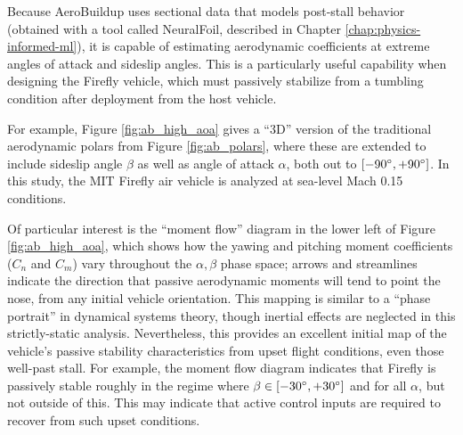 Because AeroBuildup uses sectional data that models post-stall behavior (obtained with a tool called NeuralFoil, described in Chapter \ref{chap:physics-informed-ml}), it is capable of estimating aerodynamic coefficients at extreme angles of attack and sideslip angles. This is a particularly useful capability when designing the Firefly vehicle, which must passively stabilize from a tumbling condition after deployment from the host vehicle.

For example, Figure \ref{fig:ab_high_aoa} gives a ``3D'' version of the traditional aerodynamic polars from Figure \ref{fig:ab_polars}, where these are extended to include sideslip angle $\beta$ as well as angle of attack $\alpha$, both out to $[-90\degree, +90\degree]$. In this study, the MIT Firefly air vehicle is analyzed at sea-level Mach 0.15 conditions.

Of particular interest is the ``moment flow'' diagram in the lower left of Figure \ref{fig:ab_high_aoa}, which shows how the yawing and pitching moment coefficients ($C_n$ and $C_m$) vary throughout the $\alpha, \beta$ phase space; arrows and streamlines indicate the direction that passive aerodynamic moments will tend to point the nose, from any initial vehicle orientation. This mapping is similar to a ``phase portrait'' in dynamical systems theory, though inertial effects are neglected in this strictly-static analysis. Nevertheless, this provides an excellent initial map of the vehicle's passive stability characteristics from upset flight conditions, even those well-past stall. For example, the moment flow diagram indicates that Firefly is passively stable roughly in the regime where $\beta \in [-30\degree, +30\degree]$ and for all $\alpha$, but not outside of this. This may indicate that active control inputs are required to recover from such upset conditions.

